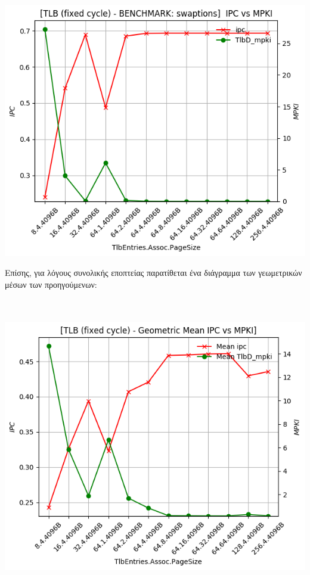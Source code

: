 \begin{minipage}{\textwidth}
    \begin{center}
        \\
        \vspace{3mm}
        \includegraphics[scale=0.70]{graphs/TLB/fixed/swaptions.png}
        \vspace{6mm}
    \end{center}
\end{minipage}

Επίσης, για λόγους συνολικής εποπτείας παρατίθεται ένα διάγραμμα των γεωμετρικών μέσων των προηγούμενων:\\\\
\begin{minipage}{\textwidth}
    \begin{center}
        \\
        \vspace{3mm}
        \includegraphics[scale=0.60]{graphs/TLB/fixed/mean.png}
        \vspace{6mm}
    \end{center}
\end{minipage}

